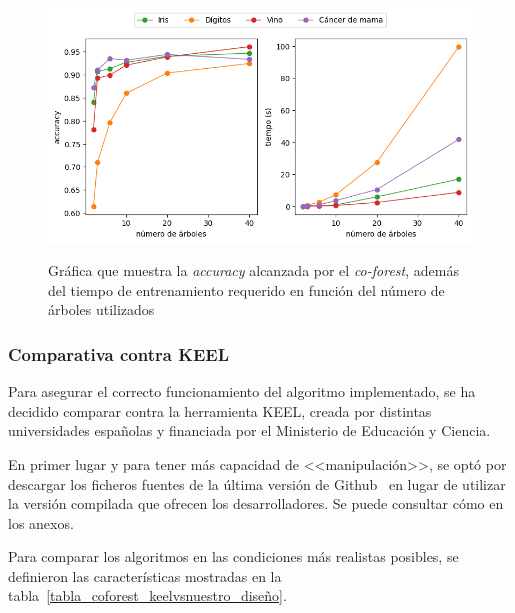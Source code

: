 \begin{itemize}
	\begin{figure}[h]
		\caption[\textit{Co-Forest}: resultados (número de árboles)]{Gráfica que muestra la \textit{accuracy} alcanzada por el \textit{co-forest}, además del tiempo de entrenamiento requerido en función del número de árboles utilizados}
		\centering
		\includegraphics[scale=0.7]{../img/memoria/5_coforest_trees}
		\label{cf:tt_trees}
	\end{figure}
	
\end{itemize} 


\subsubsection{Comparativa contra KEEL}

Para asegurar el correcto funcionamiento del algoritmo implementado, se ha decidido comparar contra la herramienta KEEL, creada por distintas universidades españolas y financiada por el Ministerio de Educación y Ciencia.

En primer lugar y para tener más capacidad de <<manipulación>>, se optó por descargar los ficheros fuentes de la última versión de Github~\cite{keelRepo} en lugar de utilizar la versión compilada que ofrecen los desarrolladores. Se puede consultar cómo en los anexos.

Para comparar los algoritmos en las condiciones más realistas posibles, se definieron las características mostradas en la tabla~\ref{tabla_coforest_keelvsnuestro_diseño}.

